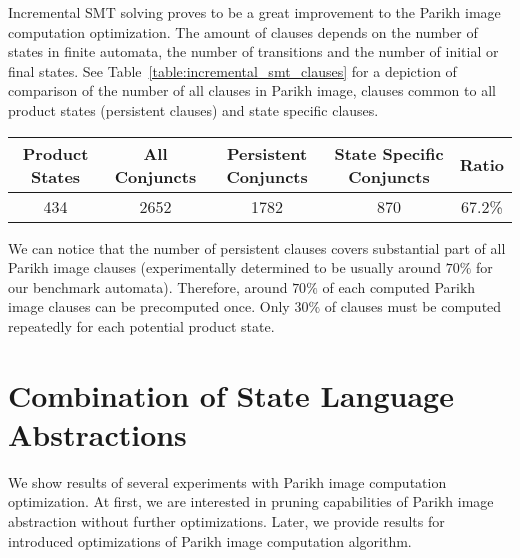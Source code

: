 Incremental SMT solving proves to be a great improvement to the Parikh image computation optimization. The amount of clauses depends on the number of states in finite automata, the number of transitions and the number of initial or final states. See Table~\ref{table:incremental_smt_clauses} for a depiction of comparison of the number of all clauses in Parikh image, clauses common to all product states (persistent clauses) and state specific clauses.

\begin{table*}[ht]
	\centering
	\small
    \begin{tabular}{ |c|c|c|c|c| }
        \hline
        Product States & All Conjuncts & Persistent Conjuncts & State Specific Conjuncts & Ratio \\ \hline
        434 & 2652 & 1782 & 870 & 67.2\% \\ \hline
    \end{tabular}
    \caption{An example proportion of persistent and state specific clauses in Parikh image computation with incremental SMT solving optimization. The \emph{Product States} column shows the number of product states in the whole intersection product, the \emph{All Clauses} column shows the number of clauses in each computed Parikh image, the \emph{Persistent Clauses} column shows the number of persistent clauses in the whole Parikh image (out of the all Parikh image clauses), \emph{State Specific Clauses} column states how many Parikh image clauses have to be recomputed for each product state and \emph{Ratio} column shows the ratio of persistent clauses in all Parikh image clauses.}
    \label{table:incremental_smt_clauses}
\end{table*}

We can notice that the number of persistent clauses covers substantial part of all Parikh image clauses (experimentally determined to be usually around $70 \%$ for our benchmark automata). Therefore, around $70\%$ of each computed Parikh image clauses can be precomputed once. Only $30\%$ of clauses must be computed repeatedly for each potential product state.

\section{Combination of State Language Abstractions}

We show results of several experiments with Parikh image computation optimization. At first, we are interested in pruning capabilities of Parikh image abstraction without further optimizations. Later, we provide results for introduced optimizations of Parikh image computation algorithm.

